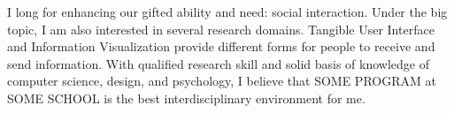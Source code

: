 I long for enhancing our gifted ability and need: social interaction. 
Under the big topic, I am also interested in several research domains. 
Tangible User Interface and Information Visualization provide different forms for people to receive and send information. 
With qualified research skill and solid basis of knowledge of computer science, design, and psychology, 
I believe that SOME PROGRAM at SOME SCHOOL is the best interdisciplinary environment for me.
